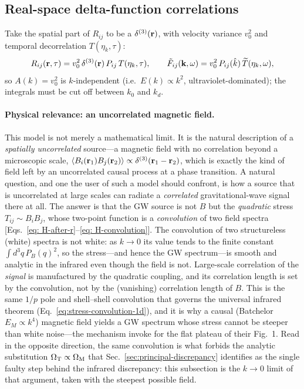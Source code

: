 \documentclass[10pt,prd,aps,nobibnotes,superscriptaddress,preprintnumbers,notitlepage]{revtex4-1}
\newcommand{\khat}{\hat{k}}
\newcommand{\br}{{\bf r}}
\newcommand{\kb}{{\bf k}}
\begin{document}
\subsection{Real-space delta-function correlations}
\label{sec:white}

Take the spatial part of $R_{ij}$ to be a $\delta^{(3)}(\br)$, with velocity variance $v_0^2$ and temporal decorrelation $T(\eta_k,\tau)$:
\begin{equation}
  R_{ij}(\br,\tau) = v_0^2\,\delta^{(3)}(\br)\,P_{ij}\,T(\eta_k,\tau),
  \qquad
  \tilde F_{ij}(\kb,\omega) = v_0^2\,P_{ij}(\khat)\,\widetilde T(\eta_k,\omega),
  \label{eq:Fwhite}
\end{equation}
so $A(k)=v_0^2$ is $k$-independent (i.e.\ $E(k)\propto k^2$, ultraviolet-dominated); the integrals must be cut off between $k_0$ and $k_d$.

\paragraph{Physical relevance: an uncorrelated magnetic field.}
This model is not merely a mathematical limit. It is the natural description of a
\emph{spatially uncorrelated} source---a magnetic field with no correlation beyond a
microscopic scale, $\langle B_i(\br_1)B_j(\br_2)\rangle\propto\delta^{(3)}(\br_1-\br_2)$,
which is exactly the kind of field left by an uncorrelated causal process at a phase
transition. A natural question, and one the user of such a model should confront, is how a
source that is uncorrelated at large scales can radiate a \emph{correlated} gravitational-wave
signal there at all. The answer is that the GW source is not $B$ but the \emph{quadratic}
stress $T_{ij}\sim B_iB_j$, whose two-point function is a \emph{convolution} of two field
spectra [Eqs.~\eqref{eq: H-after-r}--\eqref{eq: H-convolution}]. The convolution of two
structureless (white) spectra is not white: as $k\to0$ its value tends to the finite constant
$\int\!d^3q\,P_B(q)^2$, so the stress---and hence the GW spectrum---is smooth and analytic in
the infrared even though the field is not. Large-scale correlation of the \emph{signal} is
manufactured by the quadratic coupling, and its correlation length is set by the convolution,
not by the (vanishing) correlation length of $B$. This is the same $1/p$ pole and shell--shell
convolution that governs the universal infrared theorem (Eq.~\eqref{eq:stress-convolution-1d}),
and it is why a causal (Batchelor $E_M\propto k^4$) magnetic field yields a GW spectrum whose
stress cannot be steeper than white noise---the mechanism \cite{RoperPol:2019wvy} invoke for the
flat plateau of their Fig.~1. Read in the opposite direction, the same convolution is what
forbids the analytic substitution $\Omega_{\rm T}\propto\Omega_{\rm M}$ that
Sec.~\ref{sec:principal-discrepancy} identifies as the single faulty step behind the
infrared discrepancy: this subsection is the $k\to0$ limit of that argument, taken with the
steepest possible field.
\end{document}
